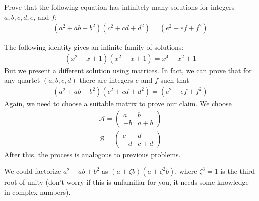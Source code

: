 \documentclass{subfile}
\begin{document}
\begin{problem}
Prove that the following equation has infinitely many solutions for integers $a,b,c,d,e$, and $f$:
\begin{align*}
(a^2+ab+b^2)(c^2+cd+d^2)=(e^2+ef+f^2)
\end{align*}
\end{problem}

\begin{solution}
The following identity gives an infinite family of solutions:
\begin{align*}
(x^2+x+1)(x^2-x+1)=x^4+x^2+1
\end{align*}
But we present a different solution using matrices. In fact, we can prove that for any quartet $(a,b,c,d)$ there are integers $e$ and $f$ such that
\begin{align*}
(a^2+ab+b^2)(c^2+cd+d^2)=(e^2+ef+f^2)
\end{align*}
Again, we need to choose a suitable matrix to prove our claim. We choose
\begin{align*}
\mathcal{A}=\begin{pmatrix}
a & b\\
-b & a+b
\end{pmatrix}\\
\mathcal{B}=\begin{pmatrix}
c & d\\
-d & c+d
\end{pmatrix}
\end{align*}
After this, the process is analogous to previous problems.
\end{solution}

\begin{note}
We could factorize $a^2+ab+b^2$ as $(a+\zeta b)(a+\zeta^2b)$, where $\zeta^3=1$ is the third root of unity (don't worry if this is unfamiliar for you, it needs some knowledge in complex numbers).
\end{note}
\end{document}
